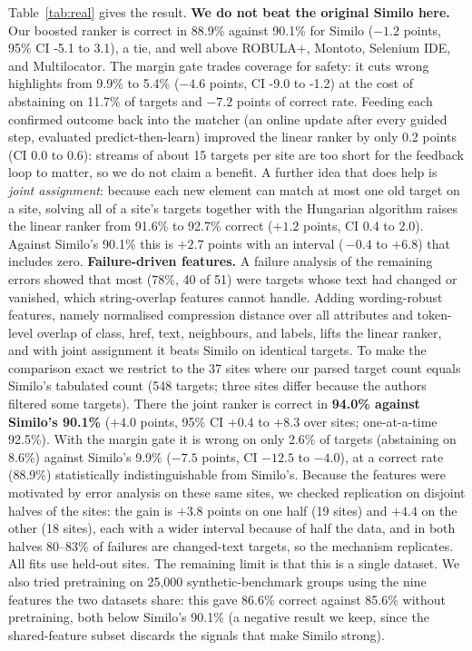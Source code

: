 \documentclass[conference]{IEEEtran}
\begin{document}
Table~\ref{tab:real} gives the result. \textbf{We do not beat the original Similo here.} Our boosted ranker is correct in 88.9\% against 90.1\% for Similo ($-1.2$ points, 95\% CI -5.1 to 3.1), a tie, and well above ROBULA+, Montoto, Selenium IDE, and Multilocator. The margin gate trades coverage for safety: it cuts wrong highlights from 9.9\% to 5.4\% ($-4.6$ points, CI -9.0 to -1.2) at the cost of abstaining on 11.7\% of targets and $-7.2$ points of correct rate. Feeding each confirmed outcome back into the matcher (an online update after every guided step, evaluated predict-then-learn) improved the linear ranker by only 0.2 points (CI 0.0 to 0.6): streams of about 15 targets per site are too short for the feedback loop to matter, so we do not claim a benefit. A further idea that does help is \emph{joint assignment}: because each new element can match at most one old target on a site, solving all of a site's targets together with the Hungarian algorithm raises the linear ranker from 91.6\% to 92.7\% correct ($+1.2$ points, CI 0.4 to 2.0). Against Similo's 90.1\% this is $+2.7$ points with an interval (\,$-0.4$ to $+6.8$) that includes zero. \textbf{Failure-driven features.} A failure analysis of the remaining errors showed that most (78\%, 40 of 51) were targets whose text had changed or vanished, which string-overlap features cannot handle. Adding wording-robust features, namely normalised compression distance over all attributes and token-level overlap of class, href, text, neighbours, and labels, lifts the linear ranker, and with joint assignment it beats Similo on identical targets. To make the comparison exact we restrict to the 37 sites where our parsed target count equals Similo's tabulated count (548 targets; three sites differ because the authors filtered some targets). There the joint ranker is correct in \textbf{94.0\% against Similo's 90.1\%} ($+4.0$ points, 95\% CI $+0.4$ to $+8.3$ over sites; one-at-a-time 92.5\%). With the margin gate it is wrong on only 2.6\% of targets (abstaining on 8.6\%) against Similo's 9.9\% ($-7.5$ points, CI $-12.5$ to $-4.0$), at a correct rate (88.9\%) statistically indistinguishable from Similo's. Because the features were motivated by error analysis on these same sites, we checked replication on disjoint halves of the sites: the gain is $+3.8$ points on one half (19 sites) and $+4.4$ on the other (18 sites), each with a wider interval because of half the data, and in both halves 80--83\% of failures are changed-text targets, so the mechanism replicates. All fits use held-out sites. The remaining limit is that this is a single dataset. We also tried pretraining on 25{,}000 synthetic-benchmark groups using the nine features the two datasets share: this gave 86.6\% correct against 85.6\% without pretraining, both below Similo's 90.1\% (a negative result we keep, since the shared-feature subset discards the signals that make Similo strong).
\end{document}
